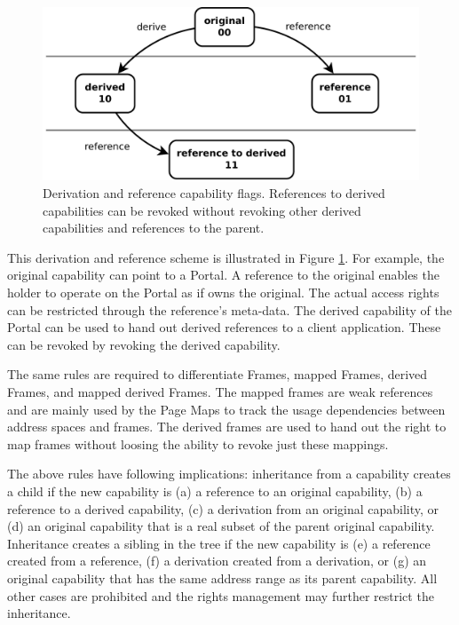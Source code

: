 \begin{figure}
  \centering
  \includegraphics[scale=0.25]{fig/DerivedReferenceBits.pdf}
  \caption{Derivation and reference capability flags. References to derived capabilities can be revoked without revoking other derived capabilities and references to the parent.}
  \label{fig:cap-types}
\end{figure}

This derivation and reference scheme is illustrated in Figure \ref{fig:cap-types}. For example, the original capability can point to a Portal. A reference to the original enables the holder to operate on the Portal as if owns the original. The actual access rights can be restricted through the reference's meta-data. The derived capability of the Portal can be used to hand out derived references to a client application. These can be revoked by revoking the derived capability.  

The same rules are required to differentiate Frames, mapped Frames, derived Frames, and mapped derived Frames. The mapped frames are weak references and are mainly used by the Page Maps to track the usage dependencies between address spaces and frames. The derived frames are used to hand out the right to map frames without loosing the ability to revoke just these mappings.

The above rules have following implications: inheritance from a capability creates a child if the new capability is (a) a reference to an original capability, (b) a reference to a derived capability, (c) a derivation from an original capability, or (d) an original capability that is a real subset of the parent original capability. 
Inheritance creates a sibling in the tree if the new capability is (e) a reference created from a reference, (f) a derivation created from a derivation, or (g) an original capability that has the same address range as its parent capability.
All other cases are prohibited and the rights management may further restrict the inheritance.

